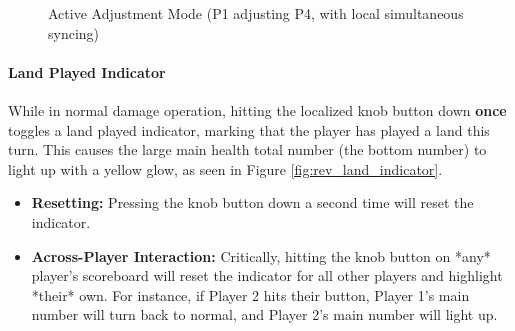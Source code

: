 \documentclass[11pt,a4paper]{article}
\begin{document}
\begin{figure}[h!]
    \centering
    \caption{Active Adjustment Mode (P1 adjusting P4, with local simultaneous syncing)}
    \label{fig:rev_cmd_adjust}
\end{figure}

\paragraph{Land Played Indicator}
While in normal damage operation, hitting the localized knob button down \textbf{once} toggles a land played indicator, marking that the player has played a land this turn. This causes the large main health total number (the bottom number) to light up with a yellow glow, as seen in Figure \ref{fig:rev_land_indicator}.
\begin{itemize}
    \item \textbf{Resetting:} Pressing the knob button down a second time will reset the indicator.
    \item \textbf{Across-Player Interaction:} Critically, hitting the knob button on *any* player's scoreboard will reset the indicator for all other players and highlight *their* own. For instance, if Player 2 hits their button, Player 1's main number will turn back to normal, and Player 2's main number will light up.
\end{itemize}
\end{document}
